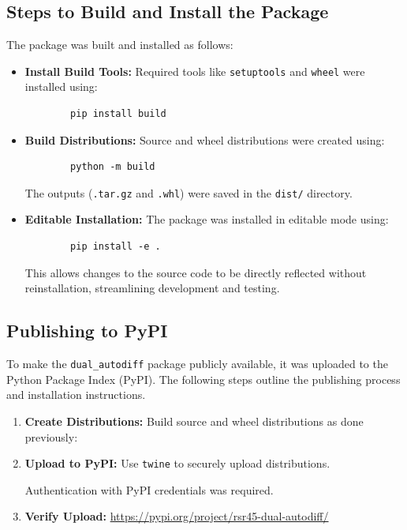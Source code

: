 \documentclass[a4paper,12pt]{article}
\begin{document}
    \subsection{Steps to Build and Install the Package}
    The package was built and installed as follows:
    \begin{itemize}
        \item \textbf{Install Build Tools:} Required tools like \texttt{setuptools} and \texttt{wheel} were installed using:
        \begin{verbatim}
        pip install build
        \end{verbatim}
        \item \textbf{Build Distributions:} Source and wheel distributions were created using:
        \begin{verbatim}
        python -m build
        \end{verbatim}
        The outputs (\texttt{.tar.gz} and \texttt{.whl}) were saved in the \texttt{dist/} directory.
        \item \textbf{Editable Installation:} The package was installed in editable mode using:
        \begin{verbatim}
        pip install -e .
        \end{verbatim}
        This allows changes to the source code to be directly reflected without reinstallation, streamlining development and testing.
    \end{itemize}
    

\subsection{Publishing to PyPI}

To make the \texttt{dual\_autodiff} package publicly available, it was uploaded to the Python Package Index (PyPI). The following steps outline the publishing process and installation instructions.


\begin{enumerate}
    \item \textbf{Create Distributions:}
    Build source and wheel distributions as done previously:

    \item \textbf{Upload to PyPI:}
    Use \texttt{twine} to securely upload distributions.
    
    Authentication with PyPI credentials was required.

    \item \textbf{Verify Upload:}
    \url{https://pypi.org/project/rsr45-dual-autodiff/}
\end{enumerate}
\end{document}
